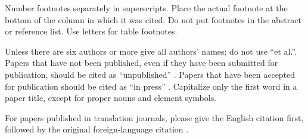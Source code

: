 \documentclass[conference]{IEEEtran}
\begin{document}
Number footnotes separately in superscripts. Place the actual footnote at
the bottom of the column in which it was cited. Do not put footnotes in the
abstract or reference list. Use letters for table footnotes.

Unless there are six authors or more give all authors' names; do not use
``et al.''. Papers that have not been published, even if they have been
submitted for publication, should be cited as ``unpublished'' \cite{b4}. Papers
that have been accepted for publication should be cited as ``in press'' \cite{b5}.
Capitalize only the first word in a paper title, except for proper nouns and
element symbols.

For papers published in translation journals, please give the English
citation first, followed by the original foreign-language citation \cite{b6}.





\end{document}
